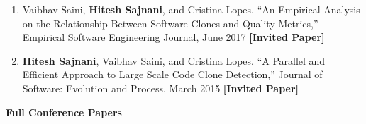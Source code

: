 \documentclass[letterpaper,11pt]{article}
\begin{document}
\begin{enumerate}

 \item\small{Vaibhav Saini, \textbf{Hitesh Sajnani}, and Cristina Lopes. “An Empirical Analysis on the
Relationship Between Software Clones and Quality Metrics,” Empirical Software Engineering Journal, June 2017 \textbf{[Invited Paper]}}

 \vspace{-1pt}\item\small{\textbf{Hitesh Sajnani}, Vaibhav Saini, and Cristina Lopes. “A Parallel and Efficient Approach
to Large Scale Code Clone Detection,” Journal of Software: Evolution and Process, March 2015 \textbf{[Invited Paper]}}

\end{enumerate}



\textbf{ Full Conference Papers}
\end{document}
